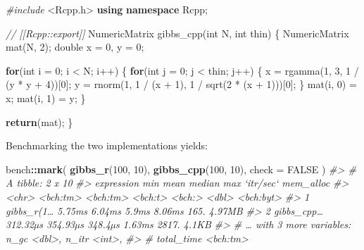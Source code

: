 \documentclass[]{book}
\newenvironment{Shaded}{\begin{snugshade}}{\end{snugshade}}
\newcommand{\CommentTok}[1]{\textcolor[rgb]{0.37,0.37,0.37}{\textit{#1}}}
\newcommand{\ControlFlowTok}[1]{\textcolor[rgb]{0.27,0.27,0.27}{\textbf{#1}}}
\newcommand{\DataTypeTok}[1]{\textcolor[rgb]{0.27,0.27,0.27}{#1}}
\newcommand{\DecValTok}[1]{\textcolor[rgb]{0.06,0.06,0.06}{#1}}
\newcommand{\ImportTok}[1]{#1}
\newcommand{\KeywordTok}[1]{\textcolor[rgb]{0.27,0.27,0.27}{\textbf{#1}}}
\newcommand{\NormalTok}[1]{#1}
\newcommand{\OperatorTok}[1]{\textcolor[rgb]{0.43,0.43,0.43}{\textbf{#1}}}
\newcommand{\OtherTok}[1]{\textcolor[rgb]{0.37,0.37,0.37}{#1}}
\newcommand{\PreprocessorTok}[1]{\textcolor[rgb]{0.37,0.37,0.37}{\textit{#1}}}
\begin{document}
\begin{Shaded}
\begin{Highlighting}[]
\PreprocessorTok{#include }\ImportTok{<Rcpp.h>}
\KeywordTok{using} \KeywordTok{namespace}\NormalTok{ Rcpp;}

\CommentTok{// [[Rcpp::export]]}
\NormalTok{NumericMatrix gibbs_cpp(}\DataTypeTok{int}\NormalTok{ N, }\DataTypeTok{int}\NormalTok{ thin) \{}
\NormalTok{  NumericMatrix mat(N, }\DecValTok{2}\NormalTok{);}
  \DataTypeTok{double}\NormalTok{ x = }\DecValTok{0}\NormalTok{, y = }\DecValTok{0}\NormalTok{;}

  \ControlFlowTok{for}\NormalTok{(}\DataTypeTok{int}\NormalTok{ i = }\DecValTok{0}\NormalTok{; i < N; i++) \{}
    \ControlFlowTok{for}\NormalTok{(}\DataTypeTok{int}\NormalTok{ j = }\DecValTok{0}\NormalTok{; j < thin; j++) \{}
\NormalTok{      x = rgamma(}\DecValTok{1}\NormalTok{, }\DecValTok{3}\NormalTok{, }\DecValTok{1}\NormalTok{ / (y * y + }\DecValTok{4}\NormalTok{))[}\DecValTok{0}\NormalTok{];}
\NormalTok{      y = rnorm(}\DecValTok{1}\NormalTok{, }\DecValTok{1}\NormalTok{ / (x + }\DecValTok{1}\NormalTok{), }\DecValTok{1}\NormalTok{ / sqrt(}\DecValTok{2}\NormalTok{ * (x + }\DecValTok{1}\NormalTok{)))[}\DecValTok{0}\NormalTok{];}
\NormalTok{    \}}
\NormalTok{    mat(i, }\DecValTok{0}\NormalTok{) = x;}
\NormalTok{    mat(i, }\DecValTok{1}\NormalTok{) = y;}
\NormalTok{  \}}

  \ControlFlowTok{return}\NormalTok{(mat);}
\NormalTok{\}}
\end{Highlighting}
\end{Shaded}

Benchmarking the two implementations yields:

\begin{Shaded}
\begin{Highlighting}[]
\NormalTok{bench}\OperatorTok{::}\KeywordTok{mark}\NormalTok{(}
  \KeywordTok{gibbs_r}\NormalTok{(}\DecValTok{100}\NormalTok{, }\DecValTok{10}\NormalTok{),}
  \KeywordTok{gibbs_cpp}\NormalTok{(}\DecValTok{100}\NormalTok{, }\DecValTok{10}\NormalTok{),}
  \DataTypeTok{check =} \OtherTok{FALSE}
\NormalTok{)}
\CommentTok{#> # A tibble: 2 x 10}
\CommentTok{#>   expression      min     mean  median    max `itr/sec` mem_alloc}
\CommentTok{#>   <chr>      <bch:tm> <bch:tm> <bch:t> <bch:>     <dbl> <bch:byt>}
\CommentTok{#> 1 gibbs_r(1…   5.75ms   6.04ms   5.9ms 8.06ms      165.    4.97MB}
\CommentTok{#> 2 gibbs_cpp… 312.32µs 354.93µs 348.4µs 1.63ms     2817.     4.1KB}
\CommentTok{#> # … with 3 more variables: n_gc <dbl>, n_itr <int>,}
\CommentTok{#> #   total_time <bch:tm>}
\end{Highlighting}
\end{Shaded}
\end{document}

